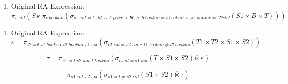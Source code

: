 \documentclass{article}
\begin{document}

    \item %
    \begin{enumerate}
        \item Original RA Expression: %
        \begin{displaymath}
            \pi_{s.sid}(S \ltimes
            \pi_{t.bookno}(\sigma_{s1.sid=t.sid\ \wedge\ b.price > 50\ \wedge\ b.bookno = t.bookno\ \wedge\ s1.sname='Eric'}(S1 \times B \times T)))
        \end{displaymath}

    \end{enumerate}

    \item %
    \begin{enumerate}
        \item Original RA Expression: %
        \begin{displaymath}
            \varepsilon = \pi_{t2.sid, t1.bookno, t2.bookno, s1.sid}(\sigma_{t2.sid=s2.sid \wedge t1.bookno \ne t2.bookno}(T1 \times T2 \times S1 \times S2))
        \end{displaymath}

        \begin{displaymath}
            \tau = \pi_{s1.sid, s2.sid, t.bookno}(\sigma_{t.sid=s1.sid}(T \times S1 \times S2) \overline{\ltimes} \varepsilon)
        \end{displaymath}

        \begin{displaymath}
            \pi_{s1.sid, s2.sid}(\sigma_{s1.sid \ne s2.sid}(S1 \times S2) \overline{\ltimes} \tau)
        \end{displaymath}
    \end{enumerate}
\end{document}
